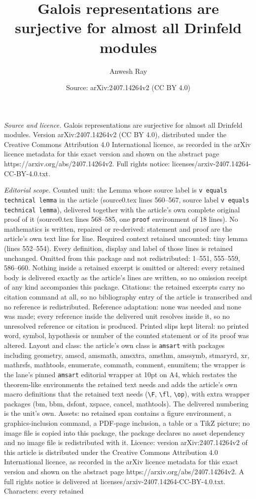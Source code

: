 \documentclass[10pt,a4paper]{amsart}
\title[Galois representations are surjective for almost all Drinfel]{Galois representations are surjective for almost all Drinfeld modules}
\author{Anwesh Ray}
\date{Source: arXiv:2407.14264v2 (CC BY 4.0)}
\begin{document}
\maketitle

\noindent\emph{Source and licence.} Galois representations are surjective for almost all Drinfeld modules. Version arXiv:2407.14264v2 (CC BY 4.0), distributed under the Creative Commons Attribution 4.0 International licence, as recorded in the arXiv licence metadata for this exact version and shown on the abstract page https://arxiv.org/abs/2407.14264v2. Full rights notice: licenses/arxiv-2407.14264-CC-BY-4.0.txt.\par\smallskip

\noindent\textit{Editorial scope.} Counted unit: the Lemma whose source label is \texttt{v equals technical lemma} in the article (source0.tex lines 560--567, source label \texttt{v equals technical lemma}), delivered together with the article's own complete original proof of it (source0.tex lines 568--585, one \texttt{proof} environment of 18 lines). No mathematics is written, repaired or re-derived: statement and proof are the article's own text line for line. Required context retained uncounted: tiny lemma (lines 552--554). Every definition, display and label of those lines is retained unchanged. Omitted from this package and not redistributed: 1--551, 555--559, 586--660. Nothing inside a retained excerpt is omitted or altered: every retained body is delivered exactly as the article's lines are written, so no omission receipt of any kind accompanies this package. Citations: the retained excerpts carry no citation command at all, so no bibliography entry of the article is transcribed and no reference is redistributed. Reference adaptation: none was needed and none was made; every reference inside the delivered unit resolves inside it, so no unresolved reference or citation is produced. Printed slips kept literal: no printed word, symbol, hypothesis or number of the counted statement or of its proof was altered. Layout and class: the article's own class is \texttt{amsart} with packages including geometry, amscd, amsmath, amsxtra, amsthm, amssymb, stmaryrd, xr, mathrsfs, mathtools, enumerate, commath, comment, enumitem; the wrapper is the lane's pinned \texttt{amsart} editorial wrapper at 10pt on A4, which restates the theorem-like environments the retained text needs and adds the article's own macro definitions that the retained text needs (\texttt{\textbackslash F}, \texttt{\textbackslash fl}, \texttt{\textbackslash op}), with extra wrapper packages (bm, bbm, dsfont, xspace, cancel, mathtools). The delivered numbering is the unit's own. Assets: no retained span contains a figure environment, a graphics-inclusion command, a PDF-page inclusion, a table or a TikZ picture; no image file is copied into this package, the package declares no asset dependency and no image file is redistributed with it. Licence: version arXiv:2407.14264v2 of this article is distributed under the Creative Commons Attribution 4.0 International licence, as recorded in the arXiv licence metadata for this exact version and shown on the abstract page https://arxiv.org/abs/2407.14264v2. A full rights notice is delivered at licenses/arxiv-2407.14264-CC-BY-4.0.txt. Characters: every retained 
\end{document}
